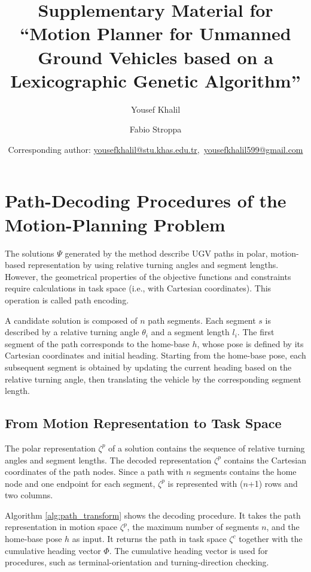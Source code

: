 \documentclass[8pt]{article}
\title{Supplementary Material for ``Motion Planner for Unmanned Ground Vehicles based on a Lexicographic Genetic Algorithm''}
\author[1]{Yousef Khalil}
\author[1]{Fabio Stroppa}
\affil[1]{Computer Engineering Department, Kadir Has University, Istanbul, Turkey}
\date{Corresponding author: \href{mailto:yousefkhalil@stu.khas.edu.tr}{yousefkhalil@stu.khas.edu.tr},~\href{mailto:yousefkhalil599@gmail.com}{yousefkhalil599@gmail.com}}
\begin{document}
\maketitle



 


\abstract{}

\section{Path-Decoding Procedures of the Motion-Planning Problem}

The solutions $\Psi$ generated by the method describe UGV paths in polar, motion-based representation by using relative turning angles and segment lengths. However, the geometrical properties of the objective functions and constraints require calculations in task space (i.e., with Cartesian coordinates). This operation is called path encoding.

A candidate solution is composed of $n$ path segments. Each segment $s$ is described by a relative turning angle $\theta_i$ and a segment length $l_i$. The first segment of the path corresponds to the home-base $h$, whose pose is defined by its Cartesian coordinates and initial heading. Starting from the home-base pose, each subsequent segment is obtained by updating the current heading based on the relative turning angle, then translating the vehicle by the corresponding segment length.

\subsection{From Motion Representation to Task Space}
The polar representation $\zeta^p$ of a solution contains the sequence of relative turning angles and segment lengths. The decoded representation $\zeta^p$ contains the Cartesian coordinates of the path nodes. Since a path with $n$ segments contains the home node and one endpoint for each segment, $\zeta^p$ is represented with ($n$+1) rows and two columns. 

Algorithm \ref{alg:path_transform} shows the decoding procedure. It takes the path representation in motion space $\zeta^p$, the maximum number of segments $n$, and the home-base pose $h$ as input. It returns the path in task space $\zeta^c$ together with the cumulative heading vector $\Phi$. The cumulative heading vector is used for procedures, such as terminal-orientation and turning-direction checking.
\end{document}
